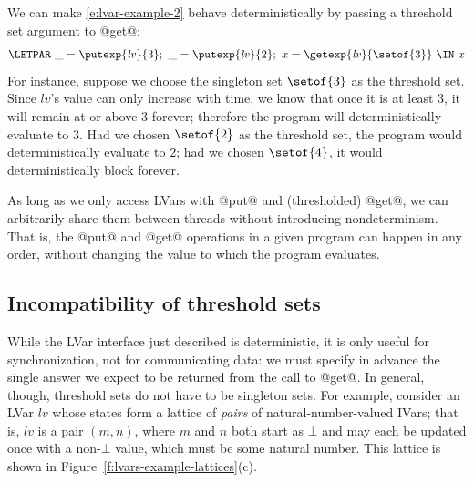 We can make \ref{e:lvar-example-2} behave deterministically by passing
a threshold set argument to @get@:
\begin{equation}
\begin{split}
\LETPAR ~\_ = \putexp{\mathit{lv}}{3};
  ~\_ = \putexp{\mathit{lv}}{2}; 
  ~x = \getexp{\mathit{lv}}{\setof{3}} 
  ~ \IN~x
\end{split}
\label{e:lvar-example-3}
\end{equation}
For instance, suppose we choose the singleton set $\setof{3}$ as the
threshold set.  Since $\mathit{lv}$'s value can only increase with
time, we know that once it is at least $3$, it will remain at or above
$3$ forever; therefore the program will deterministically evaluate to
$3$.  Had we chosen $\setof{2}$ as the threshold set, the program
would deterministically evaluate to $2$; had we chosen $\setof{4}$, it
would deterministically block forever.

As long as we only access LVars with @put@ and (thresholded) @get@, we
can arbitrarily share them between threads without introducing
nondeterminism. That is, the @put@ and @get@ operations in a given
program can happen in any order, without changing the value to which
the program evaluates.

\subsection{Incompatibility of threshold sets}

While the LVar interface just described is deterministic, it is only useful for
synchronization, not for communicating data: we must specify in advance the
single answer we expect to be returned from the call to @get@.  In general,
though, threshold sets do not have to be singleton sets.  For example, consider
an LVar $\mathit{lv}$ whose states form a lattice of \emph{pairs} of
natural-number-valued IVars; that is, $\mathit{lv}$ is a pair $(m, n)$, where
$m$ and $n$ both start as $\bot$ and may each be updated once with a non-$\bot$
value, which must be some natural number.
This lattice is shown in Figure~\ref{f:lvars-example-lattices}(c).

